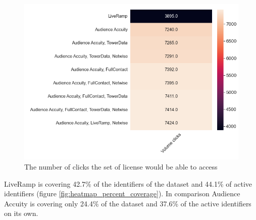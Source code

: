 \documentclass[11pt]{article} %
\begin{document}
\begin{figure}[h!]
  \includegraphics[width=0.7\linewidth]{../outputs/heatmap_volume_clicks.png}
  \caption{The number of clicks the set of license would be able to access}
  \label{fig:heatmap_vol_clicks}
\end{figure}

LiveRamp is covering 42.7\% of the identifiers of the dataset and 44.1\% of active identifiers (figure \ref{fig:heatmap_percent_coverage}). In comparison Audience Accuity is covering only 24.4\% of the dataset and 37.6\% of the active identifiers on its own.\\
\end{document}

